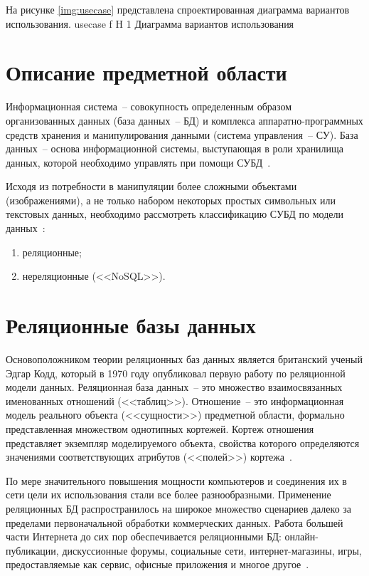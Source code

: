 На рисунке \ref{img:usecase} представлена спроектированная диаграмма вариантов использования.
	{usecase}
	{f}
	{H}
	{1\textwidth}
	{Диаграмма вариантов использования}

\section{Описание предметной области}

Информационная система~-- совокупность определенным образом организованных данных (база данных~-- БД) и комплекса аппаратно-программных средств хранения и манипулирования данными (система управления~-- СУ).
База данных~-- основа информационной системы, выступающая в роли хранилища данных, которой необходимо управлять при помощи СУБД~\cite{baseDB}.

Исходя из потребности в манипуляции более сложными объектами (изображениями), а не только набором некоторых простых символьных или текстовых данных, необходимо рассмотреть классификацию СУБД по модели данных~\cite{highloadApps}:
\begin{enumerate}
	\item реляционные;
	\item нереляционные (<<NoSQL>>).
\end{enumerate}

\section{Реляционные базы данных}

Основоположником теории реляционных баз данных является британский ученый Эдгар Кодд, который в 1970 году опубликовал первую работу по реляционной модели данных.
Реляционная база данных~-- это множество взаимосвязанных именованных отношений (<<таблиц>>).
Отношение~-- это информационная модель реального объекта (<<сущности>>) предметной области, формально представленная множеством однотипных кортежей.
Кортеж отношения представляет экземпляр моделируемого объекта, свойства которого определяются значениями соответствующих атрибутов (<<полей>>) кортежа~\cite{baseDB}.

По мере значительного повышения мощности компьютеров и соединения их в сети цели их использования стали все более разнообразными.
Применение реляционных БД распространилось на широкое множество сценариев далеко за пределами первоначальной обработки коммерческих данных.
Работа большей части Интернета до сих пор обеспечивается реляционными БД: онлайн-публикации, дискуссионные форумы, социальные сети, интернет-магазины, игры, предоставляемые как сервис, офисные приложения и многое другое~\cite{highloadApps}.

